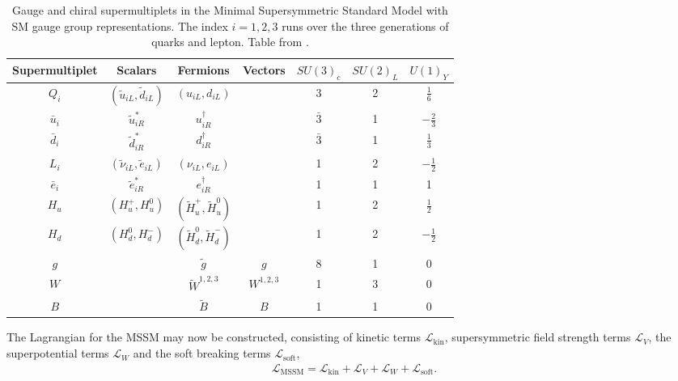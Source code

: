 \documentclass[twoside,english]{uiofysmaster}
\begin{document}
\begin{table}
\centering
\begin{tabular}{@{}ccccccc@{}}
\toprule
Supermultiplet & Scalars & Fermions & Vectors & $SU(3)_c$ & $SU(2)_L$ & $U(1)_Y$\\
\midrule
$Q_i$ & $(\tilde{u}_{iL}, \tilde{d}_{iL})$ & $(u_{iL}, d_{iL})$ & & 3 & 2 & $\frac{1}{6}$\\
$\bar{u}_i$ & $\tilde{u}_{iR}^*$ & $u_{iR}^{\dagger}$ && $\bar{3}$ & 1 & $- \frac{2}{3}$\\
$\bar{d}_i$ & $\tilde{d}_{iR}^*$ & $d_{iR}^{\dagger}$ && $\bar{3}$ & 1 & $\frac{1}{3}$\\
\midrule
$L_i$ & $(\tilde{\nu}_{iL}, \tilde{e}_{iL})$ & $(\nu_{iL}, e_{iL})$& & 1 & 2 & $- \frac{1}{2}$\\
$\bar{e}_i$ & $\tilde{e}_{iR}^*$ & $e_{iR}^{\dagger}$ && 1 & 1& 1\\
\midrule
$H_u$ & $(H_u^+, H_u^0)$ & $(\tilde{H}_u^+, \tilde{H}_u^0)$ & & 1 & 2 & $\frac{1}{2}$\\
$H_d$ & $(H_d^0, H_d^-)$ & $(\tilde{H}_d^0, \tilde{H}_d^-)$ && 1 & 2 & $ - \frac{1}{2}$\\
\midrule
$g$ & & $\tilde{g}$ & $g$ & 8 & 1 & 0\\
$W$ && $\tilde{W}^{1,2,3}$ & $W^{1,2,3}$ & 1 & 3 & 0 \\
$B$ && $\tilde{B}$ & $B$ & 1 & 1 & 0 \\ \bottomrule
\end{tabular}
\caption{Gauge and chiral supermultiplets in the Minimal Supersymmetric Standard Model with SM gauge group representations. The index $i=1,2,3$ runs over the three generations of quarks and lepton. Table from \cite{kvellestad2015chasing}.}
\label{Tab:: Phys. back. : MSSM multiplets}
\end{table}

The Lagrangian for the MSSM may now be constructed, consisting of kinetic terms $\mathcal{L}_{\text{kin}}$, supersymmetric field strength terms $\mathcal{L}_V$, the superpotential terms $\mathcal{L}_W$ and the soft breaking terms $\mathcal{L}_{\text{soft}}$,
\begin{align}
\mathcal{L}_{\text{MSSM}} = \mathcal{L}_{\text{kin}} + \mathcal{L}_V + \mathcal{L}_W + \mathcal{L}_{\text{soft}}.
\end{align}
\end{document}
